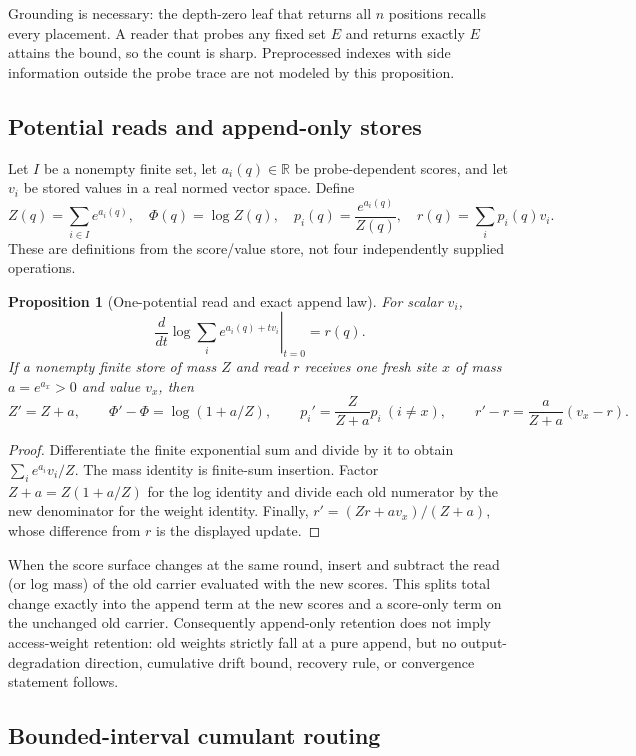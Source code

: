 \documentclass[11pt]{article}
\numberwithin{equation}{section}
\newtheorem{proposition}{Proposition}
\begin{document}
Grounding is necessary: the depth-zero leaf that returns all $n$ positions recalls every placement. A reader
that probes any fixed set $E$ and returns exactly $E$ attains the bound, so the count is sharp. Preprocessed
indexes with side information outside the probe trace are not modeled by this proposition.

\subsection{Potential reads and append-only stores}

Let $I$ be a nonempty finite set, let $a_i(q)\in\mathbb R$ be probe-dependent scores, and let $v_i$ be
stored values in a real normed vector space. Define
\[
Z(q)=\sum_{i\in I}e^{a_i(q)},\quad \Phi(q)=\log Z(q),\quad
p_i(q)=\frac{e^{a_i(q)}}{Z(q)},\quad r(q)=\sum_i p_i(q)v_i.
\]
These are definitions from the score/value store, not four independently supplied operations.

\begin{proposition}[One-potential read and exact append law]\label{prop:app-potential-store}
For scalar $v_i$,
\[
\left.\frac{d}{dt}\log\sum_i e^{a_i(q)+t v_i}\right|_{t=0}=r(q).
\]
If a nonempty finite store of mass $Z$ and read $r$ receives one fresh site $x$ of mass
$a=e^{a_x}>0$ and value $v_x$, then
\[
Z'=Z+a,\qquad \Phi'-\Phi=\log(1+a/Z),\qquad
p_i'=\frac{Z}{Z+a}p_i\ (i\ne x),\qquad
r'-r=\frac{a}{Z+a}(v_x-r).
\]
\end{proposition}
\begin{proof}
Differentiate the finite exponential sum and divide by it to obtain $\sum_i e^{a_i}v_i/Z$. The mass
identity is finite-sum insertion. Factor $Z+a=Z(1+a/Z)$ for the log identity and divide each old numerator
by the new denominator for the weight identity. Finally, $r'=(Zr+av_x)/(Z+a)$, whose difference from $r$
is the displayed update.
\end{proof}

When the score surface changes at the same round, insert and subtract the read (or log mass) of the old
carrier evaluated with the new scores. This splits total change exactly into the append term at the new
scores and a score-only term on the unchanged old carrier. Consequently append-only retention does not imply
access-weight retention: old weights strictly fall at a pure append, but no output-degradation direction,
cumulative drift bound, recovery rule, or convergence statement follows.

\subsection{Bounded-interval cumulant routing}
\end{document}
